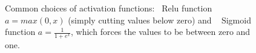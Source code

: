 
\begin{figure}
\centering
{}
\caption{Common choices of activation functions:~ Relu function $a=max(0,x)$ (simply cutting values below zero) and ~ Sigmoid function $a=\frac{1}{1+e^{x}}$, which forces the values to be between zero and one.}
\label{fig:activation}
\end{figure}

